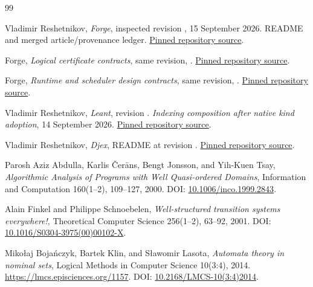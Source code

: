 \begin{thebibliography}{99}
\small\raggedright
{}
Vladimir Reshetnikov, \emph{Forge}, inspected revision
, 15 September 2026.
README and merged article/provenance ledger.
\href{https://github.com/VladimirReshetnikov/Forge/tree/58ea206bd7ad501b930add568151217bcc7f82a2}{Pinned repository source}.

Forge, \emph{Logical certificate contracts}, same revision,
.
\href{https://github.com/VladimirReshetnikov/Forge/blob/58ea206bd7ad501b930add568151217bcc7f82a2/lean/Forge/Design/Contracts.lean}{Pinned repository source}.

Forge, \emph{Runtime and scheduler design contracts}, same revision,
.
\href{https://github.com/VladimirReshetnikov/Forge/blob/58ea206bd7ad501b930add568151217bcc7f82a2/lean/Forge/Design/Runtime.lean}{Pinned repository source}.

Vladimir Reshetnikov, \emph{Leant}, revision
.
\emph{Indexing composition after native kind adoption}, 14 September 2026.
\href{https://github.com/VladimirReshetnikov/Leant/blob/6bf05ad78c467989e68290f2d08bbed40802d485/docs/reports/2026-09-14-indexing-composition-diagnostics.md}{Pinned repository source}.

Vladimir Reshetnikov, \emph{Djex}, README at revision
.
\href{https://github.com/VladimirReshetnikov/Djex/blob/e8778f4ebd63e1f9b9b410fa4de8d14a8a04c9e5/README.md}{Pinned repository source}.

Parosh Aziz Abdulla, Karlis \v{C}er\={a}ns, Bengt Jonsson, and Yih-Kuen Tsay,
\emph{Algorithmic Analysis of Programs with Well Quasi-ordered Domains},
Information and Computation 160(1--2), 109--127, 2000.
DOI: \href{https://doi.org/10.1006/inco.1999.2843}{10.1006/inco.1999.2843}.

Alain Finkel and Philippe Schnoebelen, \emph{Well-structured transition systems
everywhere!}, Theoretical Computer Science 256(1--2), 63--92, 2001.
DOI: \href{https://doi.org/10.1016/S0304-3975(00)00102-X}{10.1016/S0304-3975(00)00102-X}.

Miko\l{}aj Boja\'nczyk, Bartek Klin, and S\l{}awomir Lasota,
\emph{Automata theory in nominal sets}, Logical Methods in Computer Science
10(3:4), 2014.
\url{https://lmcs.episciences.org/1157}.
DOI: \href{https://doi.org/10.2168/LMCS-10(3:4)2014}{10.2168/LMCS-10(3:4)2014}.


\end{thebibliography}
